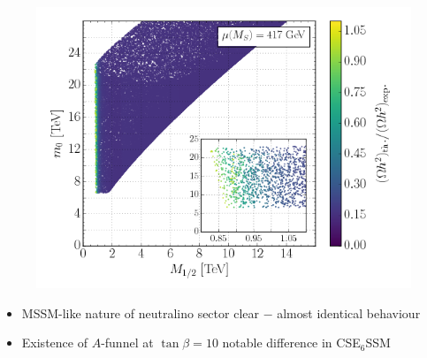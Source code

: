 \documentclass[10pt,aspectratio=169]{beamer}
\begin{document}
\begin{frame}
\begin{columns}[t]
\begin{column}{0.5\textwidth}
\begin{figure}
        \includegraphics[width=\textwidth]{cmssm_mupos400GeV_m12m0_Omega}
      \end{figure}
      \vspace{-12pt}
      \begin{itemize}
        \item MSSM-like nature of neutralino sector clear $-$
          almost identical behaviour
        \item {\color{blue} Existence of $A$-funnel at $\tan\beta = 10$ notable
          difference in CSE$_6$SSM}
      \end{itemize}
      \end{column}
  \end{columns}
\end{frame}
\end{document}
